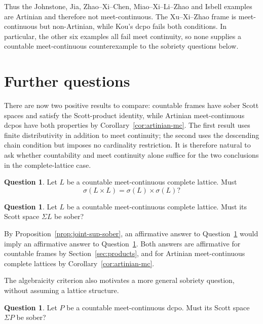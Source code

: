 \documentclass[11pt,reqno]{amsart}
\theoremstyle{definition}
\newtheorem{question}[theorem]{Question}
\numberwithin{equation}{section}
\begin{document}
Thus the Johnstone, Jia, Zhao--Xi--Chen, Miao--Xi--Li--Zhao and Isbell
examples are Artinian and therefore not meet-continuous. The
Xu--Xi--Zhao frame is meet-continuous but non-Artinian, while Kou's
dcpo fails both conditions. In particular, the other six examples all
fail meet continuity, so none supplies a countable meet-continuous
counterexample to the sobriety questions below.

\section{Further questions}\label{sec:questions}

There are now two positive results to compare: countable frames have
sober Scott spaces and satisfy the Scott-product identity, while
Artinian meet-continuous dcpos have both properties by
Corollary~\ref{cor:artinian-mc}. The first result uses finite
distributivity in addition to meet continuity; the second uses the
descending chain condition but imposes no cardinality restriction.
It is therefore natural to ask whether countability and meet continuity
alone suffice for the two conclusions in the complete-lattice case.

\begin{question}\label{ques:countable-mc-product}
Let $L$ be a countable meet-continuous complete lattice. Must
\[
  \sigma(L\times L)=\sigma(L)\times\sigma(L)?
\]
\end{question}

\begin{question}\label{ques:countable-mc-sober}
Let $L$ be a countable meet-continuous complete lattice. Must its Scott
space $\Sigma L$ be sober?
\end{question}

By Proposition~\ref{prop:joint-sup-sober}, an affirmative answer to
Question~\ref{ques:countable-mc-product} would imply an affirmative answer
to Question~\ref{ques:countable-mc-sober}. Both answers are affirmative
for countable frames by Section~\ref{sec:products}, and for Artinian
meet-continuous complete lattices by Corollary~\ref{cor:artinian-mc}.

The algebraicity criterion also motivates a more general sobriety
question, without assuming a lattice structure.

\begin{question}\label{ques:countable-mc-dcpo}
Let $P$ be a countable meet-continuous dcpo. Must its Scott space
$\Sigma P$ be sober?
\end{question}
\end{document}
